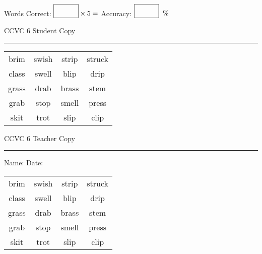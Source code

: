 \documentclass{memoir}
\begin{document}
\normalsize

Words Correct: $\fbox{\phantom{\huge 100}} \times 5 = $ Accuracy: $\fbox{\phantom{\huge 100}}\;\; \%$ 

\vfill

\newpage


\footnotesize \noindent
CCVC 6 \hfill Student Copy
\smallskip
\hrule

\Large

\setlength{\tabcolsep}{14pt}
\def\arraystretch{3}

{\selectfont


\begin{vplace}[0.5]
\begin{center}
\begin{tabular}{cccc}
brim      & swish & strip & struck \\
class             & swell & blip & drip \\
grass                    & drab             & brass       & stem \\
grab                    & stop & smell & press       \\
skit & trot & slip & clip \\
\end{tabular}
\end{center}
\end{vplace}

}

\newpage

\footnotesize \noindent
CCVC 6 \hfill Teacher Copy
\smallskip
\hrule

\normalsize

\vfill

\noindent
Name: \underline{\hspace{1.75in}} \hfill Date: \underline{\hspace{1in}}

\Large

{\selectfont


\begin{vplace}[0.5]
\begin{center}
\begin{tabular}{cccc}
brim      & swish & strip & struck \\
class             & swell & blip & drip \\
grass                    & drab             & brass       & stem \\
grab                    & stop & smell & press       \\
skit & trot & slip & clip \\
\end{tabular}
\end{center}
\end{vplace}



}
\end{document}
